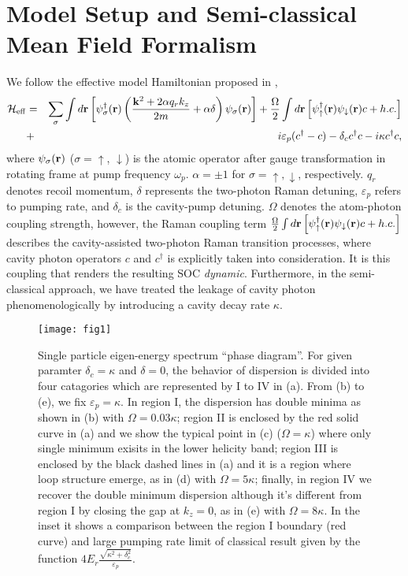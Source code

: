 \documentclass[atoms,article,submit,moreauthors,pdftex,12pt,a4paper]{mdpi}
\def\ba{\begin{eqnarray}}
\def\ea{\end{eqnarray}}
\begin{document}
\section{Model Setup and Semi-classical Mean Field Formalism} \label{meanfield}

We follow the effective model Hamiltonian proposed in \cite{cavitySOC}, 
\ba
 \mathcal{H}_{\rm eff}& = & \sum_\sigma\int d{\bf r}\left[ \psi^\dagger_\sigma({\bf r})\left(\frac{ {\bf k}^2+ 2\alpha q_r {k}_z}{2m}+\alpha\delta\right)\psi_\sigma({\bf r})\right]+  \frac{\Omega}{2}\int d{\bf r}\left[{\psi}_{\uparrow}^{\dagger}({\bf r}){\psi}_{\downarrow}({\bf r})c+ h.c. \right]\nonumber \\
 & + & i\varepsilon_{p}(c^{\dagger}-c)-\delta_c c^{\dagger}c-i\kappa c^{\dagger}c, \label{effH}
 \ea
where $\psi_\sigma({\bf r})$ ($\sigma = \uparrow$, $\downarrow$) is the atomic operator after gauge transformation in rotating frame at pump frequency $\omega_p$. $\alpha=\pm 1$ for $\sigma=\uparrow,\downarrow$, respectively. $q_r$ denotes recoil momentum, $\delta$ represents the two-photon Raman detuning, $\varepsilon_p$ refers to pumping rate, and $\delta_c$ is the cavity-pump detuning. $\Omega$ denotes the atom-photon coupling strength, however, the Raman coupling term $ \frac{\Omega}{2}\int d{\bf r}\left[\psi_{\uparrow}^{\dagger}({\bf r})\psi_{\downarrow}({\bf r})c+h.c.\right]$ describes the cavity-assisted two-photon Raman transition processes, where cavity photon operators $c$ and $c^\dag$ is explicitly taken into consideration. It is this coupling that renders the resulting SOC \emph{dynamic}. Furthermore, in the semi-classical approach, we have treated the leakage of cavity photon phenomenologically by introducing a cavity decay rate $\kappa$. 

\begin{figure}[htp]
\texttt{[image: fig1]}\caption{ Single particle eigen-energy spectrum ``phase diagram''. For given paramter $\delta_c=\kappa$ and $\delta=0$, the behavior of dispersion is divided into four catagories which are represented by I to IV in (a). From (b) to (e), we fix $\varepsilon_p=\kappa$. In region I, the dispersion has double minima as shown in (b) with $\Omega=0.03\kappa$; region II is enclosed by the red solid curve in (a) and we show the typical point in (c) ($\Omega=\kappa$) where only single minimum exisits in the lower helicity band; region III is enclosed by the black dashed lines in (a) and it is a region where loop structure emerge, as in (d) with $\Omega=5\kappa$; finally, in region IV we recover the double minimum dispersion although it's different from region I by closing the gap at $k_z=0$, as in (e) with $\Omega=8\kappa$. In the inset it shows a comparison between the region I boundary (red curve) and large pumping rate limit of classical result given by the function $4E_r\frac{\sqrt{\kappa^2+\delta_c^2}}{\varepsilon_p}$.    }\label{fig1}
\end{figure}
\end{document}
